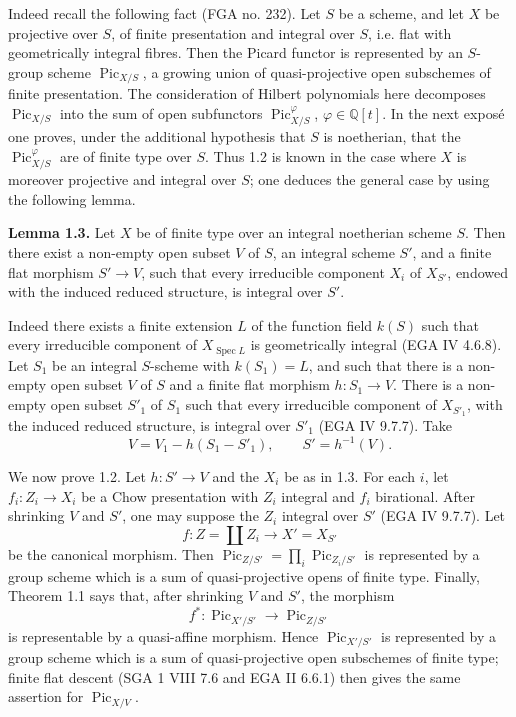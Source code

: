 \documentclass[11pt]{article}
\newcommand{\Spec}{\operatorname{Spec}}
\providecommand{\Pic}{\operatorname{Pic}}
\begin{document}
Indeed recall the following fact (FGA no. 232). Let \(S\) be a scheme, and let \(X\) be projective over \(S\), of finite presentation and integral over \(S\), i.e. flat with geometrically integral fibres. Then the Picard functor is represented by an \(S\)-group scheme \(\Pic_{X/S}\), a growing union of quasi-projective open subschemes of finite presentation. The consideration of Hilbert polynomials here decomposes \(\Pic_{X/S}\) into the sum of open subfunctors \(\Pic^\varphi_{X/S}\), \(\varphi\in\mathbb Q[t]\). In the next exposé one proves, under the additional hypothesis that \(S\) is noetherian, that the \(\Pic^\varphi_{X/S}\) are of finite type over \(S\). Thus 1.2 is known in the case where \(X\) is moreover projective and integral over \(S\); one deduces the general case by using the following lemma.

\textbf{Lemma 1.3.} Let \(X\) be of finite type over an integral noetherian scheme \(S\). Then there exist a non-empty open subset \(V\) of \(S\), an integral scheme \(S'\), and a finite flat morphism \(S'\to V\), such that every irreducible component \(X_i\) of \(X_{S'}\), endowed with the induced reduced structure, is integral over \(S'\).

Indeed there exists a finite extension \(L\) of the function field \(k(S)\) such that every irreducible component of \(X_{\Spec L}\) is geometrically integral (EGA IV 4.6.8). Let \(S_1\) be an integral \(S\)-scheme with \(k(S_1)=L\), and such that there is a non-empty open subset \(V\) of \(S\) and a finite flat morphism \(h:S_1\to V\). There is a non-empty open subset \(S'_1\) of \(S_1\) such that every irreducible component of \(X_{S'_1}\), with the induced reduced structure, is integral over \(S'_1\) (EGA IV 9.7.7). Take
\[
  V=V_1-h(S_1-S'_1),\qquad S'=h^{-1}(V).
\]

We now prove 1.2. Let \(h:S'\to V\) and the \(X_i\) be as in 1.3. For each \(i\), let \(f_i:Z_i\to X_i\) be a Chow presentation with \(Z_i\) integral and \(f_i\) birational. After shrinking \(V\) and \(S'\), one may suppose the \(Z_i\) integral over \(S'\) (EGA IV 9.7.7). Let
\[
  f:Z=\coprod Z_i\longrightarrow X'=X_{S'}
\]
be the canonical morphism. Then \(\Pic_{Z/S'}=\prod_i\Pic_{Z_i/S'}\) is represented by a group scheme which is a sum of quasi-projective opens of finite type. Finally, Theorem 1.1 says that, after shrinking \(V\) and \(S'\), the morphism
\[
  f^*:\Pic_{X'/S'}\longrightarrow \Pic_{Z/S'}
\]
is representable by a quasi-affine morphism. Hence \(\Pic_{X'/S'}\) is represented by a group scheme which is a sum of quasi-projective open subschemes of finite type; finite flat descent (SGA 1 VIII 7.6 and EGA II 6.6.1) then gives the same assertion for \(\Pic_{X/V}\).
\end{document}
